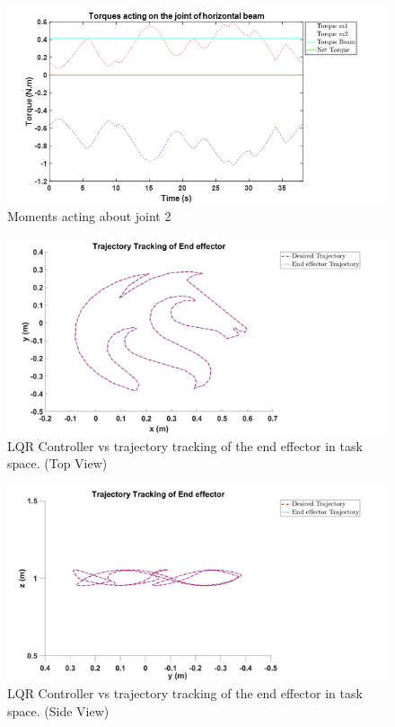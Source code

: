 \documentclass{UoNMCHA}
\numberwithin{equation}{section}
\begin{document}
	

	
	\begin{figure}[H]
		\begin{center}
			\includegraphics[width=.8\linewidth]{figs/Picture31}
			\caption{Moments acting about joint 2}
			\label{figs/Picture31}
		\end{center}
	\end{figure}
	

	
	\begin{figure}[H]
		\begin{center}
			\includegraphics[width=.8\linewidth]{figs/Picture32}
			\caption{LQR Controller vs trajectory tracking of the end effector in task space. (Top View)}
			\label{figs/Picture32}
		\end{center}
	\end{figure}
	
	\begin{figure}[H]
		\begin{center}
			\includegraphics[width=.8\linewidth]{figs/Picture322}
			\caption{LQR Controller vs trajectory tracking of the end effector in task space. (Side View)}
			\label{figs/Picture322}
		\end{center}
	\end{figure}
	
\end{document}
